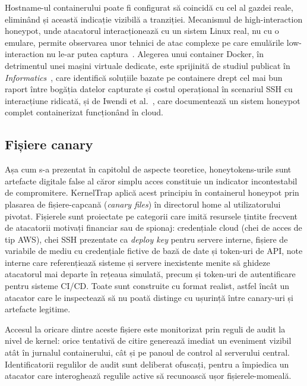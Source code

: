 Hostname-ul containerului poate fi configurat să coincidă cu cel al gazdei reale, eliminând
și această indicație vizibilă a tranziției. Mecanismul de high-interaction honeypot, unde
atacatorul interacționează cu un
sistem Linux real, nu cu o emulare, permite observarea unor tehnici de atac complexe pe care
emulările low-interaction nu le-ar putea captura~\cite{spitzner2002honeypots}. Alegerea unui
container Docker, în detrimentul unei mașini virtuale dedicate, este sprijinită de studiul
publicat în \textit{Informatics}~\cite{honeypotsurvey2025}, care identifică soluțiile bazate pe
containere drept cel mai bun raport între bogăția datelor capturate și costul operațional în
scenariul SSH cu interacțiune ridicată, și de Iwendi et al.~\cite{iwendi2023container}, care
documentează un sistem honeypot complet containerizat funcționând în cloud.

\subsection{Fișiere canary}

Așa cum s-a prezentat în capitolul de aspecte teoretice, honeytokens-urile sunt artefacte
digitale false al căror simplu acces constituie un indicator incontestabil de compromitere.
KernelTrap aplică acest principiu în containerul honeypot prin plasarea de fișiere-capcană
(\textit{canary files}) în directorul home al utilizatorului pivotat. Fișierele sunt
proiectate pe categorii care imită resursele țintite frecvent de atacatorii motivați
financiar sau de spionaj: credențiale cloud (chei de acces de tip AWS), chei SSH prezentate
ca \textit{deploy key} pentru servere interne, fișiere de variabile de mediu cu credențiale
fictive de bază de date și token-uri de API, note interne care referențiează sisteme și
servere inexistente menite să ghideze atacatorul mai departe în rețeaua simulată, precum și
token-uri de autentificare pentru sisteme CI/CD. Toate sunt construite cu format realist,
astfel încât un atacator care le inspectează să nu poată distinge cu ușurință între
canary-uri și artefacte legitime.

Accesul la oricare dintre aceste fișiere este monitorizat prin reguli de audit la nivel de
kernel: orice tentativă de citire generează imediat un eveniment vizibil atât în jurnalul
containerului, cât și pe panoul de control al serverului central. Identificatorii regulilor
de audit sunt deliberat ofuscați, pentru a împiedica un atacator care interoghează regulile
active să recunoască ușor fișierele-momeală.

